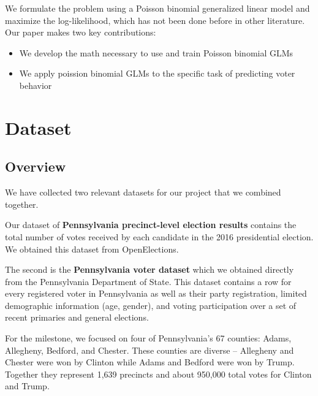 \documentclass[10pt, letterpaper]{article}
\begin{document}
We formulate the problem using a Poisson binomial generalized linear model and maximize the log-likelihood, which has not been done before in other literature. \\

Our paper makes two key contributions:
\begin{itemize}[noitemsep]
	\item We develop the math necessary to use and train Poisson binomial GLMs
	\item We apply poission binomial GLMs to the specific task of predicting voter behavior
\end{itemize}

\section{Dataset}

\subsection{Overview}

We have collected two relevant datasets for our project that we combined together.

Our dataset of \textbf{Pennsylvania precinct-level election results} contains the total number of votes received by each candidate in the 2016 presidential election. We obtained this dataset from OpenElections\cite{OpenElections}.

The second is the \textbf{Pennsylvania voter dataset} which we obtained directly from the Pennsylvania Department of State\cite{PAVoterFile}. This dataset contains a row for every registered voter in Pennsylvania as well as their party registration, limited demographic information (age, gender), and voting participation over a set of recent primaries and general elections.

For the milestone, we focused on four of Pennsylvania's 67 counties: Adams, Allegheny, Bedford, and Chester. These counties are diverse -- Allegheny and Chester were won by Clinton while Adams and Bedford were won by Trump. Together they represent 1,639 precincts and about 950,000 total votes for Clinton and Trump. 
\end{document}
